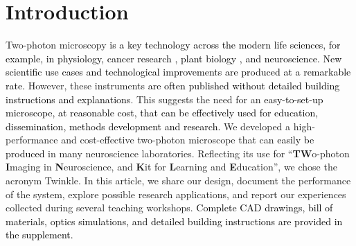 \documentclass[10pt,letterpaper]{article}
\begin{document}
\linenumbers

\section*{Introduction}
%
Two-photon microscopy\cite{Denk1990, Svoboda1997} \textcolor{black}{is a key technology across the modern life sciences\cite{Zipfel2003}, for example, in physiology\cite{Ueki2020, Dunn2002}, cancer research \cite{Perry2012}, plant biology \cite{Cheung2010}, and neuroscience\cite{So2000, Helmchen2005}. New scientific use cases and technological improvements are produced at a remarkable rate\cite{Luu2024}.} However, these instruments \textcolor{black}{are often published without detailed building instructions and explanations}. This suggests the need for an \textcolor{black}{easy-to-set-up microscope, at reasonable cost, that can be effectively used for education, dissemination, methods development and research.} We developed a high-performance and cost-effective two-photon microscope that can \textcolor{black}{easily be produced} in many neuroscience laboratories. Reflecting its use for ``\textbf{TW}o-photon \textbf{I}maging in \textbf{N}euroscience, and \textbf{K}it for \textbf{L}earning and \textbf{E}ducation'', we chose the acronym Twinkle. In this article, we share our design, document the performance of the system, explore possible research applications, and report our experiences collected during several teaching workshops. \textcolor{black}{Complete CAD drawings, bill of materials, optics simulations, and detailed building instructions are provided in the supplement.}
\end{document}
